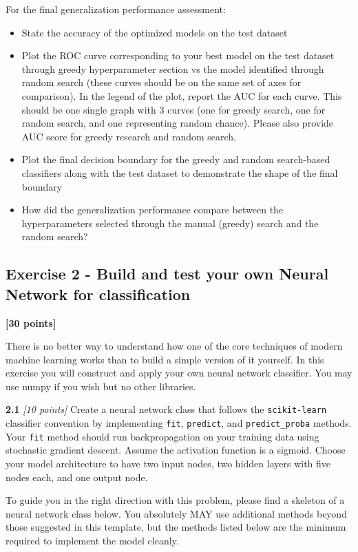 \documentclass[
  letterpaper,
  DIV=11,
  numbers=noendperiod]{scrartcl}
\providecommand{\tightlist}{%
  \setlength{\itemsep}{0pt}\setlength{\parskip}{0pt}}\usepackage{longtable,booktabs,array}
\begin{document}
For the final generalization performance assessment:

\begin{itemize}
\tightlist
\item
  State the accuracy of the optimized models on the test dataset
\item
  Plot the ROC curve corresponding to your best model on the test
  dataset through greedy hyperparameter section vs the model identified
  through random search (these curves should be on the same set of axes
  for comparison). In the legend of the plot, report the AUC for each
  curve. This should be one single graph with 3 curves (one for greedy
  search, one for random search, and one representing random chance).
  Please also provide AUC score for greedy research and random search.
\item
  Plot the final decision boundary for the greedy and random
  search-based classifiers along with the test dataset to demonstrate
  the shape of the final boundary
\item
  How did the generalization performance compare between the
  hyperparameters selected through the manual (greedy) search and the
  random search?
\end{itemize}

\subsection{Exercise 2 - Build and test your own Neural Network for
classification}\label{exercise-2---build-and-test-your-own-neural-network-for-classification}

\textbf{{[}30 points{]}}

There is no better way to understand how one of the core techniques of
modern machine learning works than to build a simple version of it
yourself. In this exercise you will construct and apply your own neural
network classifier. You may use numpy if you wish but no other
libraries.

\textbf{2.1} \emph{{[}10 points{]}} Create a neural network class that
follows the \texttt{scikit-learn} classifier convention by implementing
\texttt{fit}, \texttt{predict}, and \texttt{predict\_proba} methods.
Your \texttt{fit} method should run backpropagation on your training
data using stochastic gradient descent. Assume the activation function
is a sigmoid. Choose your model architecture to have two input nodes,
two hidden layers with five nodes each, and one output node.

To guide you in the right direction with this problem, please find a
skeleton of a neural network class below. You absolutely MAY use
additional methods beyond those suggested in this template, but the
methods listed below are the minimum required to implement the model
cleanly.
\end{document}
